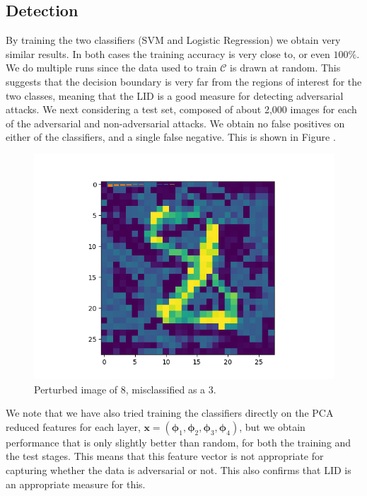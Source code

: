 \subsection{Detection}

By training the two classifiers (SVM and Logistic Regression) we obtain very similar results. In both cases the training accuracy is very close to, or even $100\%$. We do multiple runs since the data used to train $\mathcal{C}$ is drawn at random. This suggests that the decision boundary is very far from the regions of interest for the two classes, meaning that the LID is a good measure for detecting adversarial attacks. We next considering a test set, composed of about 2,000 images for each of the adversarial and non-adversarial attacks. We obtain no false positives on either of the classifiers, and a single false negative. This is shown in Figure .
\begin{figure}[!h]
\centering
\includegraphics[scale=0.8]{eightthree.png}
\caption{Perturbed image of 8, misclassified as a 3.}
\end{figure}
We note that we have also tried training the classifiers directly on the PCA reduced features for each layer, $\mathbf{x} =(\boldsymbol{\phi}_1,\boldsymbol{\phi}_2,\boldsymbol{\phi}_3,\boldsymbol{\phi}_4)$, but we obtain performance that is only slightly better than random, for both the training and the test stages. This means that this feature vector is not appropriate for capturing whether the data is adversarial or not. This also confirms that LID is an appropriate measure for this.